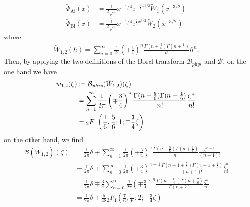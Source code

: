 \documentclass{article}
\newcommand{\series}[1]{\tilde{#1}}
\newcommand*{\defeq}{\mathrel{\vcenter{\baselineskip0.5ex \lineskiplimit0pt
                     \hbox{\scriptsize.}\hbox{\scriptsize.}}}%
                     =}
\newcommand{\borel}{\mathcal{B}}
\theoremstyle{definition}
\theoremstyle{plain}
\begin{document}
\begin{align*}
\series{\Phi}_{\mathrm{Ai}}(x)&=\frac{1}{2\sqrt{\pi}}x^{-1/4}e^{-\tfrac{2}{3}x^{3/2}}\tilde{W}_1(x^{-3/2})\\
\series{\Phi}_{\mathrm{Bi}}(x)&=\frac{1}{2\sqrt{\pi}}x^{-1/4}e^{\tfrac{2}{3}x^{3/2}}\tilde{W}_2(x^{-3/2})
\end{align*}  
where 
\begin{align*}
\tilde{W}_{1,2}(\hbar)=\sum_{n=0}^{\infty}\frac{1}{2\pi}\left(\mp\frac{3}{4}\right)^{n}\frac{\Gamma(n+\frac{5}{6})\Gamma(n+\frac{1}{6})}{n!}\hbar^n.
\end{align*}
Then, by applying the two definitions of the Borel transform $\borel_{\textit{phys}}$ and $\borel$, on the one hand we have  
\begin{align*}
w_{1,2}(\zeta)&\defeq\borel_{\textit{phys}}(\tilde{W}_{1,2})(\zeta)\\
&=\sum_{n=0}^{\infty}\frac{1}{2\pi}\left(\mp\frac{3}{4}\right)^{n}\frac{\Gamma(n+\frac{5}{6})\Gamma(n+\frac{1}{6})}{n!}\frac{\zeta^n}{n!}\\
&={}_2F_1\left(\frac{1}{6},\frac{5}{6};1;\mp\frac{3}{4}\zeta\right) 
\end{align*}
on the other hand, we find
\begin{align*}
\borel(\tilde{W}_{1,2})(\zeta)&=\frac{1}{2\pi}\delta+\sum_{n=1}^{\infty} \frac{1}{2\pi}\left(\mp\frac{3}{4}\right)^{n}\frac{\Gamma(n+\frac{5}{6})\Gamma(n+\frac{1}{6})}{n!}\frac{\zeta^{n-1}}{(n-1)!}\\
&=\frac{1}{2\pi}\delta+\sum_{n=0}^{\infty} \frac{1}{2\pi}\left(\mp\frac{3}{4}\right)^{n+1}\frac{\Gamma(n+1+\frac{5}{6})\Gamma(n+1+\frac{1}{6})}{(n+1)!}\frac{\zeta^{n}}{n!}\\
&=\frac{1}{2\pi}\delta\mp\frac{3}{4}\sum_{n=0}^{\infty} \frac{1}{2\pi}\left(\mp\frac{3}{4}\right)^{n}\frac{\Gamma(n+\frac{11}{6})\Gamma(n+\frac{7}{6})}{\Gamma(n+2)}\frac{\zeta^{n}}{n!}\\
&=\frac{1}{2\pi}\delta\mp\frac{5}{48} {}_2F_1\left(\frac{7}{6},\frac{11}{6};2;\mp\frac{3}{4}\zeta\right)%
\end{align*}
\end{document}
